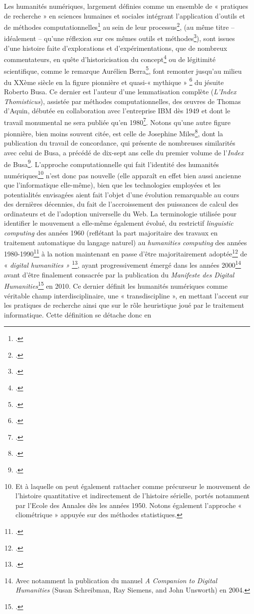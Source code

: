 Les humanités numériques, largement définies comme un ensemble de « pratiques de recherche » en sciences humaines et sociales intégrant l’application d’outils et de méthodes computationnelles\footcite[p.33]{ manovich_data_2015 } au sein de leur processus\footcite[p.90]{ bermes_patrimoine_2020}, (au même titre – idéalement – qu’une réflexion sur ces mêmes outils et méthodes\footcite{anderson_teaching_nodate}), sont issues d’une histoire faite d’explorations et d’expérimentations, que de nombreux commentateurs, en quête d’historicisation du concept\footcite[p.33-49]{clavert_humanites_2019} ou de légitimité scientifique, comme le remarque Aurélien Berra\footcite[p.613-629]{ berra_pour_2015}, font remonter jusqu’au milieu du XXème siècle en la figure pionnière et quasi-« mythique » \footcite[p.315-318]{gefen_humanites_2017} du jésuite Roberto Busa. Ce dernier est l’auteur d’une lemmatisation complète (\textit{L’Index Thomisticus}), assistée par méthodes computationnelles, des œuvres de Thomas d’Aquin, débutée en collaboration avec l’entreprise IBM dès 1949 et dont le travail monumental ne sera publiée qu’en 1980\footcite{ mounier_ibm_2018}. Notons qu’une autre figure pionnière, bien moins souvent citée, est celle de Josephine Miles\footcite{bermes_patrimoine_2020}, dont la publication du travail de concordance, qui présente de nombreuses similarités avec celui de Busa, a précédé de dix-sept ans celle du premier volume de l’\textit{Index} de Busa\footcite{heffernan_search_2018}.  L’approche computationnelle qui fait l’identité des humanités numériques\footnote{Et à laquelle on peut également rattacher comme précurseur le mouvement de l’histoire quantitative et indirectement de l’histoire sérielle, portés notamment par l’Ecole des Annales dès les années 1950. Notons également l’approche « cliométrique » appuyée sur des méthodes statistiques.}   n’est donc pas nouvelle (elle apparaît en effet bien aussi ancienne que l’informatique elle-même), bien que les technologies employées et les potentialités envisagées aient fait l’objet d’une évolution remarquable au cours des dernières décennies, du fait de l’accroissement des puissances de calcul des ordinateurs et de l’adoption universelle du Web. La terminologie utilisée pour identifier le mouvement a elle-même également évolué, du restrictif  \textit{linguistic computing} des années 1960 (reflétant la part majoritaire des travaux en traitement automatique du langage naturel) au \textit{humanities computing} des années 1980-1990\footcite{burnard_quest-ce_2015} à la notion maintenant en passe d’être majoritairement adoptée\footcite[p.5]{bonfait_humanites_2021} de « \textit{digital humanities »}  \footcite{bermes_patrimoine_2020}, ayant progressivement émergé dans les années 2000\footnote{ Avec notamment la publication du manuel \textit{A Companion to Digital Humanities}  (Susan Schreibman, Ray Siemens, and John Unsworth) en 2004. }   avant d’être finalement consacrée par la publication du \textit{Manifeste des Digital Humanities}\footcite{dacos_manifeste_2011} en 2010. Ce dernier définit les humanités numériques comme véritable champ interdisciplinaire, une « transdiscipline », en mettant l’accent sur les pratiques de recherche ainsi que sur le rôle heuristique joué par le traitement informatique. Cette définition se détache donc en 